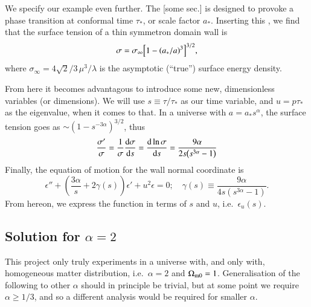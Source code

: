 


\newcommand{\eqregimenum}[1]{{\tiny{\textsf{\textbf{(#1)}}}}}



We specify our example even further. The [some sec.] is designed to provoke a phase transition at conformal time $\tau_\ast$, or scale factor $a_\ast$. Inserting this , we find that the surface tension of a thin symmetron domain wall is
\begin{equation}
    \sigma = \sigma_\infty {\left[ 1 -{\left( a_\ast/a \right)}^3  \right]}^{3/2},
\end{equation}
where $\sigma_\infty = 4\sqrt{2}/3\, \mu^3/\lambda$ is the asymptotic (``true'') surface energy density. 

From here it becomes advantagous to introduce some new, dimensionless variables (or dimensions). We will use $s\equiv \tau/\tau_\ast$ as our time variable, and $u=p\tau_\ast$ as the eigenvalue, when it comes to that. In a universe with $a = a_\ast s^\alpha$, the surface tension goes as $\sim {(1-s^{-3\alpha})}^{3/2}$, thus
\begin{equation}
    \frac{\sigma '}{\sigma} = \frac{1}{\sigma}\dv{\sigma}{s} = \dv{\ln{\sigma}}{s} = \frac{9\alpha}{2s{\left( s^{3\alpha} -1  \right)}}
\end{equation}
Finally, the equation of motion for the wall normal coordinate is
\begin{equation}\label{eq:pertwalls:untitled1:eom_final}
    \epsilon'' + \left(  \frac{3\alpha}{s}  + 2 \gamma(s)\right)\epsilon' + u^2\epsilon = 0; \quad \gamma(s)\equiv \frac{9\alpha}{4 s \left( s^{3\alpha}-1 \right)}.
\end{equation}
From hereon, we express the function in terms of $s$ and $u$, i.e.~$\epsilon_u(s)$.



\subsection{Solution for $\alpha=2$}
    This project only truly experiments in a universe with, and only with, homogeneous matter distribution, i.e.~$\alpha=2$ and $\Omega_\mathrm{m0}=1$. Generalisation of the following to other $\alpha$ should in principle be trivial, but at some point we require $\alpha\geq 1/3$, and so a different analysis would be required for smaller $\alpha$.

